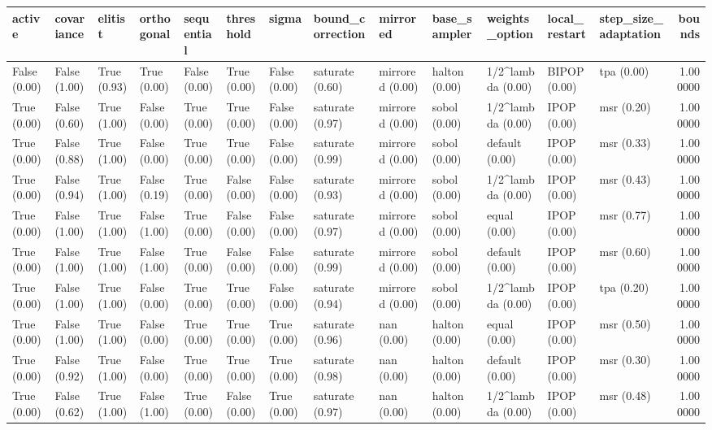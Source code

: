 \begin{tabular}{lllllllllllllr}
\toprule
active & covariance & elitist & orthogonal & sequential & threshold & sigma & bound_correction & mirrored & base_sampler & weights_option & local_restart & step_size_adaptation & bounds \\
\midrule
False (0.00) & False (1.00) & True (0.93) & True (0.00) & False (0.00) & True (0.00) & False (0.00) & saturate (0.60) & mirrored (0.00) & halton (0.00) & 1/2^lambda (0.00) & BIPOP (0.00) & tpa (0.00) & 1.000000 \\
True (0.00) & False (0.60) & True (1.00) & False (0.00) & True (0.00) & True (0.00) & False (0.00) & saturate (0.97) & mirrored (0.00) & sobol (0.00) & 1/2^lambda (0.00) & IPOP (0.00) & msr (0.20) & 1.000000 \\
True (0.00) & False (0.88) & True (1.00) & False (0.00) & True (0.00) & True (0.00) & False (0.00) & saturate (0.99) & mirrored (0.00) & sobol (0.00) & default (0.00) & IPOP (0.00) & msr (0.33) & 1.000000 \\
True (0.00) & False (0.94) & True (1.00) & False (0.19) & True (0.00) & False (0.00) & False (0.00) & saturate (0.93) & mirrored (0.00) & sobol (0.00) & 1/2^lambda (0.00) & IPOP (0.00) & msr (0.43) & 1.000000 \\
True (0.00) & False (1.00) & True (1.00) & False (1.00) & True (0.00) & False (0.00) & False (0.00) & saturate (0.97) & mirrored (0.00) & sobol (0.00) & equal (0.00) & IPOP (0.00) & msr (0.77) & 1.000000 \\
True (0.00) & False (1.00) & True (1.00) & False (1.00) & True (0.00) & False (0.00) & False (0.00) & saturate (0.99) & mirrored (0.00) & sobol (0.00) & default (0.00) & IPOP (0.00) & msr (0.60) & 1.000000 \\
True (0.00) & False (1.00) & True (1.00) & False (0.00) & True (0.00) & True (0.00) & False (0.00) & saturate (0.94) & mirrored (0.00) & sobol (0.00) & 1/2^lambda (0.00) & IPOP (0.00) & tpa (0.20) & 1.000000 \\
True (0.00) & False (1.00) & True (1.00) & False (0.00) & True (0.00) & True (0.00) & True (0.00) & saturate (0.96) & nan (0.00) & halton (0.00) & equal (0.00) & IPOP (0.00) & msr (0.50) & 1.000000 \\
True (0.00) & False (0.92) & True (1.00) & False (0.00) & True (0.00) & True (0.00) & True (0.00) & saturate (0.98) & nan (0.00) & halton (0.00) & default (0.00) & IPOP (0.00) & msr (0.30) & 1.000000 \\
True (0.00) & False (0.62) & True (1.00) & False (1.00) & True (0.00) & False (0.00) & True (0.00) & saturate (0.97) & nan (0.00) & halton (0.00) & 1/2^lambda (0.00) & IPOP (0.00) & msr (0.48) & 1.000000 \\

\end{tabular}
